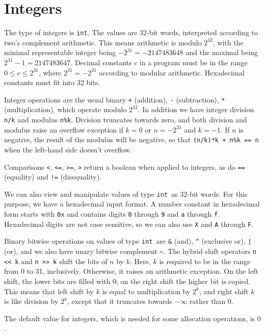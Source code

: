 \documentclass[11pt]{article}
\newcommand{\tint}{\texttt{int}}
\begin{document}
\section{Integers}

The type of integers is \tint.  The values are 32-bit words,
interpreted according to two's complement arithmetic.  This means
arithmetic is modulo $2^{32}$, with the minimal representable integer
being $-2^{31} = -2147483648$ and the maximal being $2^{31}-1 = 2147483647$.
Decimal constants $c$ in a program must be in the range $0 \leq c
\leq 2^{31}$, where $2^{31} = -2^{31}$ according to modular
arithmetic.  Hexadecimal constants must fit into 32 bits.

Integer operations are the usual binary \verb'+' (addition), \verb'-'
(subtraction), \verb'*' (multiplication), which operate modulo
$2^{32}$.  In addition we have integer division \verb'n/k' and modulus
\verb'n%k'.  Division truncates towards zero, and
both division and modulus raise an overflow exception if $k = 0$ or $n
= -2^{31}$ and $k = -1$.  If $n$ is negative, the result of the
modulus will be negative, so that \verb'(n/k)*k + n%k == n' when the
left-hand side doesn't overflow.

Comparisons \verb'<', \verb'<=', \verb'>=', \verb'>' return
a boolean when applied to integers, as do \verb'==' (equality)
and \verb'!=' (disequality).

We can also view and manipulate values of type \tint\ as 32-bit words.
For this purpose, we have a hexadecimal input format.  A number
constant in hexadecimal form starts with \verb'0x' and contains digits
\verb'0' through \verb'9' and \verb'a' through \verb'f'.  Hexadecimal
digits are not case sensitive, so we can also use \verb'X' and
\verb'A' through \verb'F'.

Binary bitwise operations on values of type \tint\ are \verb'&' (and),
\verb'^' (exclusive or), \verb'|' (or), and we also have unary bitwise
complement \verb'~'.  The hybrid shift operators \verb'n << k' and
\verb'n >> k' shift the bits of $n$ by $k$.  Here, $k$ is required to
be in the range from 0 to 31, inclusively.  Otherwise, it raises an
arithmetic exception.  On the left shift, the lower bits are filled
with 0; on the right shift the higher bit is copied.  This means that
left shift by $k$ is equal to multiplication by $2^k$, and right shift
$k$ is like division by $2^k$, except that it truncates towards
$-\infty$ rather than $0$.

The default value for integers, which is needed for some allocation
operations, is $0$.
\end{document}
